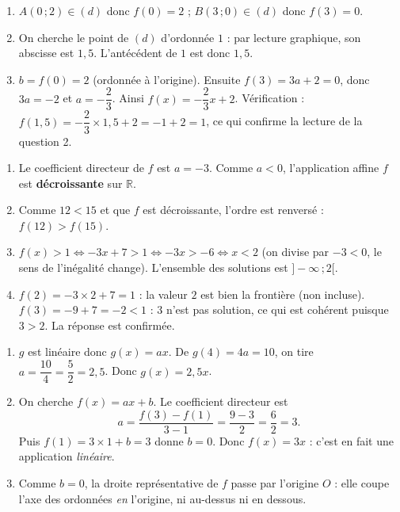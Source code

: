 \documentclass[11pt]{article}
\newcounter{popsec}
\newcounter{popsub}
\newcommand{\courssub}[1]{%
  \stepcounter{popsub}%
  \par\vspace{9pt}\noindent{\popxbold\fontsize{11.5}{13}\selectfont\color{popink}{\color{poporange}\thepopsec.\thepopsub}\hspace{6pt}#1}\par\nopagebreak\vspace{4pt}
}
\begin{document}
\begin{corrige}
\begin{enumerate}
\item $A(0\,;2)\in(d)$ donc $f(0)=2$ ; $B(3\,;0)\in(d)$ donc $f(3)=0$.
\item On cherche le point de $(d)$ d'ordonnée $1$ : par lecture graphique, son abscisse est $1{,}5$. L'antécédent de $1$ est donc $1{,}5$.
\item $b=f(0)=2$ (ordonnée à l'origine). Ensuite $f(3)=3a+2=0$, donc $3a=-2$ et $a=-\dfrac{2}{3}$. Ainsi $f(x)=-\dfrac{2}{3}x+2$. Vérification : $f(1{,}5)=-\dfrac{2}{3}\times 1{,}5+2=-1+2=1$, ce qui confirme la lecture de la question 2.
\end{enumerate}
\end{corrige}

\courssub{Je m'entraîne}

\begin{corrige}
\begin{enumerate}
\item Le coefficient directeur de $f$ est $a=-3$. Comme $a<0$, l'application affine $f$ est \textbf{décroissante} sur $\mathbb{R}$.
\item Comme $12<15$ et que $f$ est décroissante, l'ordre est renversé : $f(12)>f(15)$.
\item $f(x)>1 \iff -3x+7>1 \iff -3x>-6 \iff x<2$ (on divise par $-3<0$, le sens de l'inégalité change). L'ensemble des solutions est $]-\infty\,;2[$.
\item $f(2)=-3\times 2+7=1$ : la valeur $2$ est bien la frontière (non incluse). $f(3)=-9+7=-2<1$ : $3$ n'est pas solution, ce qui est cohérent puisque $3>2$. La réponse est confirmée.
\end{enumerate}
\end{corrige}

\begin{corrige}
\begin{enumerate}
\item $g$ est linéaire donc $g(x)=ax$. De $g(4)=4a=10$, on tire $a=\dfrac{10}{4}=\dfrac{5}{2}=2{,}5$. Donc $g(x)=2{,}5x$.
\item On cherche $f(x)=ax+b$. Le coefficient directeur est
\[ a=\frac{f(3)-f(1)}{3-1}=\frac{9-3}{2}=\frac{6}{2}=3. \]
Puis $f(1)=3\times 1+b=3$ donne $b=0$. Donc $f(x)=3x$ : c'est en fait une application \emph{linéaire}.
\item Comme $b=0$, la droite représentative de $f$ passe par l'origine $O$ : elle coupe l'axe des ordonnées \emph{en} l'origine, ni au-dessus ni en dessous.
\end{enumerate}
\end{corrige}
\end{document}
